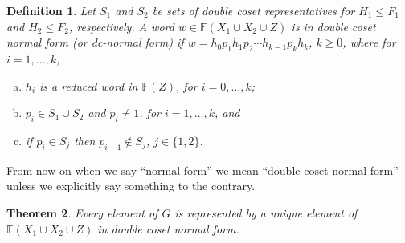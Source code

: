 \documentclass[a4paper,12pt]{article}
\newtheorem{theorem}{Theorem}[section]
\newtheorem{definition}[theorem]{Definition}
\numberwithin{equation}{section}
\numberwithin{figure}{section}
\newcommand{\FF}{\ensuremath{\mathbb{F}}}
\newcommand{\be}{\begin{enumerate}}
\newcommand{\ee}{\end{enumerate}}
\begin{document}
\begin{definition}\label{def:dcnf}  
 Let $S_1$ and $S_2$ be sets of  double coset representatives for 
$H_1\le F_1$ and $H_2\le F_2$, respectively. 
A word $w\in \FF(X_1\cup X_2\cup Z)$ is in 
\emph{double coset normal form} (or \emph{dc-normal form}) if
$w = h_{0}p_1h_{1}p_2 \cdots h_{k-1}p_kh_{{k}}$, $k\ge 0$,   where for $i=1,\ldots, k$,  
\be[(a)] 
\item $h_i$ is a reduced word in $\FF(Z)$, for $i=0,\ldots, k$; 
\item  $p_i  \in S_1\cup S_2$ and $p_i\neq 1$, for $i=1,\ldots, k$,  and 
\item if  $p_i\in S_j$ then $p_{i+1}\notin S_j$, $j\in \{1,2\}$.
\ee
\end{definition}
From now on when we say ``normal form'' we mean ``double coset normal form'' unless 
we explicitly say something to the contrary.
\begin{theorem}\label{thm:dcnf}
Every element of $G$ is represented by a unique element of 
$\FF(X_1\cup X_2\cup Z)$ in double coset normal form.
\end{theorem} 
\end{document}
